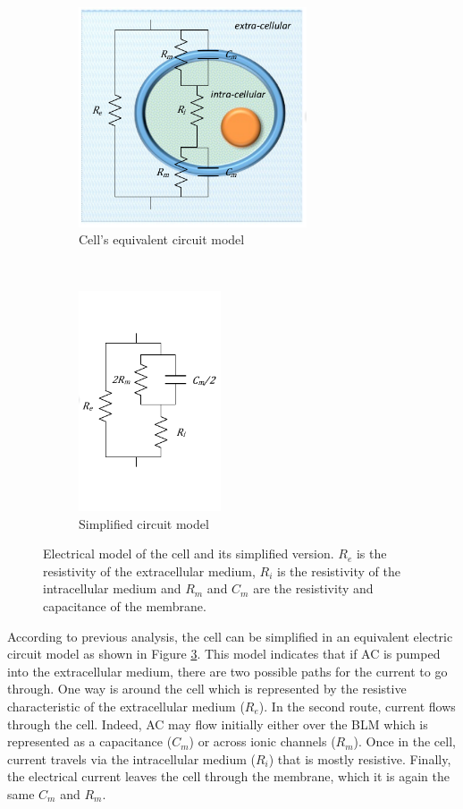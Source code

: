 \begin{figure}[!htbp]
	\centering
	\begin{subfigure}[t]{0.48\textwidth}
		\centering
		\includegraphics[height=6.5cm]{figure2a}
		\caption{Cell's equivalent circuit model}
		\label{fig:cell model}
	\end{subfigure}%
	~ 
	\begin{subfigure}[t]{0.48\textwidth}
		\centering
		\includegraphics[height=6.5cm]{figure2b}
		\caption{Simplified circuit model}
		\label{fig:cell simp model}
	\end{subfigure}
	\caption[Electrical model of the cell]{Electrical model of the cell and its simplified version. $R_e$ is the resistivity of the extracellular medium, $R_i$ is the resistivity of the intracellular medium and $R_m$ and $C_m$ are the resistivity and capacitance of the membrane.}
	\label{fig:cell models}
\end{figure}

According to previous analysis, the cell can be simplified in an equivalent electric circuit model as shown in Figure \ref{fig:cell models}. This model indicates that if AC is pumped into the extracellular medium, there are two possible paths for the current to go through. One way is around the cell which is represented by the resistive characteristic of the extracellular medium ($R_e$). In the second route, current flows through the cell. Indeed, AC may flow initially either over the BLM which is represented as a capacitance ($C_m$) or across ionic channels ($R_m$). Once in the cell, current travels via the intracellular medium ($R_i$) that is mostly resistive. Finally, the electrical current leaves the cell through the membrane, which it is again the same $C_m$ and $R_m$.

